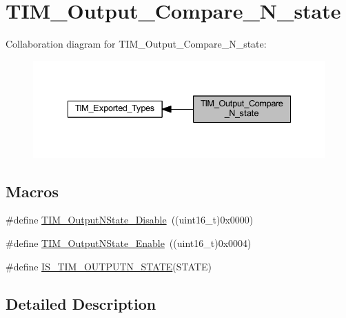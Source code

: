 \hypertarget{group___t_i_m___output___compare___n__state}{}\section{T\+I\+M\+\_\+\+Output\+\_\+\+Compare\+\_\+\+N\+\_\+state}
\label{group___t_i_m___output___compare___n__state}
Collaboration diagram for T\+I\+M\+\_\+\+Output\+\_\+\+Compare\+\_\+\+N\+\_\+state\+:
\nopagebreak
\begin{figure}[H]
\begin{center}
\leavevmode
\includegraphics[width=335pt]{group___t_i_m___output___compare___n__state}
\end{center}
\end{figure}
\subsection*{Macros}
\begin{DoxyCompactItemize}
\item 
\#define \hyperlink{group___t_i_m___output___compare___n__state_gade8506a50fd6ba58273e9da81f6b0b54}{T\+I\+M\+\_\+\+Output\+N\+State\+\_\+\+Disable}~((uint16\+\_\+t)0x0000)
\item 
\#define \hyperlink{group___t_i_m___output___compare___n__state_gac4c08f9d66ce138c6978668020526c6f}{T\+I\+M\+\_\+\+Output\+N\+State\+\_\+\+Enable}~((uint16\+\_\+t)0x0004)
\item 
\#define \hyperlink{group___t_i_m___output___compare___n__state_ga81e27a982d9707f699451f30314c4274}{I\+S\+\_\+\+T\+I\+M\+\_\+\+O\+U\+T\+P\+U\+T\+N\+\_\+\+S\+T\+A\+TE}(S\+T\+A\+TE)
\end{DoxyCompactItemize}


\subsection{Detailed Description}


